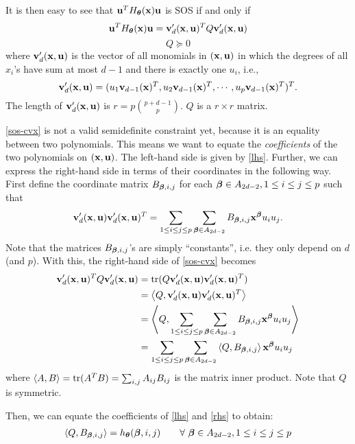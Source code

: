 \documentclass[11pt]{article}
\begin{document}
It is then easy to see that ${\bf u}^TH_{\boldsymbol\theta}({\bf x}){\bf u}$ is SOS if and only if
\begin{equation} \label{sos-cvx}
{\bf u}^TH_{\boldsymbol\theta}({\bf x}){\bf u} = {\bf v}_d'({\bf x}, {\bf u})^T Q {\bf v}_d'({\bf x}, {\bf u})
\end{equation}
\begin{equation} \label{sos-cvx-psd}
Q \succeq 0
\end{equation}
where ${\bf v}_d'({\bf x}, {\bf u})$ is the vector of all monomials in $({\bf x}, {\bf u})$ in which the degrees of all $x_i$'s have sum at most $d-1$ and there is exactly one $u_i$, i.e., 
$${\bf v}_d'({\bf x}, {\bf u}) = (u_1 {\bf v}_{d-1}({\bf x})^T, u_2 {\bf v}_{d-1}({\bf x})^T, \cdots, u_p {\bf v}_{d-1}({\bf x})^T )^T.$$
The length of ${\bf v}_d'({\bf x}, {\bf u})$ is $r = p{p+d-1 \choose p}$. $Q$ is a $r \times r$ matrix.

\eqref{sos-cvx} is not a valid semidefinite constraint yet, because it is an equality between two polynomials. This means we want to equate the \emph{coefficients} of the two polynomials on $({\bf x}, {\bf u})$. The left-hand side is given by \eqref{lhs}. Further, we can express the right-hand side in terms of their coordinates in the following way. First define the coordinate matrix $B_{{\boldsymbol\beta}, i, j}$ for each ${\boldsymbol\beta} \in A_{2d - 2}, 1 \le i \le j \le p$ such that
\[
{\bf v}_d'({\bf x}, {\bf u}) {\bf v}_d'({\bf x}, {\bf u})^T = \sum_{1 \le i \le j \le p}  \sum_{{\boldsymbol\beta} \in A_{2d - 2}} B_{{\boldsymbol\beta}, i, j} {\bf x}^{{\boldsymbol\beta}}  u_iu_j.
\]
Note that the matrices $B_{{\boldsymbol\beta}, i, j}$'s are simply ``constants'', i.e. they only depend on $d$ (and $p$). With this, the right-hand side of \eqref{sos-cvx} becomes
\begin{align}\label{rhs}
{\bf v}_d'({\bf x},{\bf u})^T Q {\bf v}_d'({\bf x},{\bf u}) &= \operatorname{tr}(Q {\bf v}_d'({\bf x}, {\bf u}) {\bf v}_d'({\bf x}, {\bf u})^T) \notag\\
&= \left\langle Q, {\bf v}_d'({\bf x}, {\bf u}) {\bf v}_d'({\bf x}, {\bf u})^T \right\rangle \notag\\
&= \left\langle Q, \sum_{1 \le i \le j \le p} \sum_{{\boldsymbol\beta} \in A_{2d - 2}} B_{{\boldsymbol\beta}, i, j} {\bf x}^{{\boldsymbol\beta}}  u_iu_j \right\rangle \notag\\
&= \sum_{1 \le i \le j \le p} \sum_{{\boldsymbol\beta} \in A_{2d - 2}} \left\langle Q, B_{{\boldsymbol\beta}, i, j} \right\rangle {\bf x}^{{\boldsymbol\beta}}  u_iu_j
\end{align}
where $\left\langle A,B \right\rangle = \operatorname{tr}(A^TB) = \sum_{i,j} A_{ij}B_{ij}$ is the  matrix inner product. Note that $Q$ is symmetric.

Then, we can equate the coefficients of \eqref{lhs} and \eqref{rhs} to obtain:
\begin{align}
\left\langle Q, B_{{\boldsymbol\beta}, i, j} \right\rangle = h_{\boldsymbol\theta}({\boldsymbol\beta}, i, j) \qquad \forall\ {\boldsymbol\beta} \in A_{2d - 2}, 1 \le i \le j \le p \label{sos-cvx-coeff}
\end{align}
\end{document}
